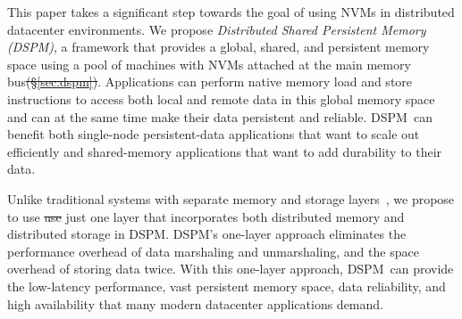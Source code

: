 \documentclass[sigconf]{acmart}
\renewcommand{\em}{\it}
\newcommand{\dsnvm}{DSPM}
\newcommand{\nvm}{PM}
\providecommand{\DIFdel}[1]{{\protect\color{red}\sout{#1}}}                      %
\providecommand{\DIFdelbegin}{} %
\providecommand{\DIFdelend}{} %
\begin{document}
This paper takes a significant step towards the goal of using NVMs in distributed datacenter environments.
We propose {\em Distributed Shared Persistent Memory (\dsnvm)},
a framework that provides a global, shared, and persistent memory space 
using a pool of machines with NVMs attached at the main memory bus\DIFdelbegin \DIFdel{(\S\ref{sec:dspm})}\DIFdelend .
Applications can perform native memory load and store instructions to access both local and remote data in this global memory space 
and can at the same time make their data persistent and reliable.
\dsnvm\ can benefit both single-node persistent-data applications that want to scale out efficiently
and shared-memory applications that want to add durability to their data.

Unlike traditional systems with separate memory and storage layers~\cite{Larchant,Perdis00,Larchant94,PerDis},
we propose to use \DIFdelbegin \DIFdel{use }\DIFdelend just one layer that incorporates both distributed memory and 
distributed storage in \dsnvm.
\dsnvm's one-layer approach eliminates the performance overhead of data marshaling and unmarshaling,
and the space overhead of storing data twice. 
With this one-layer approach, \dsnvm\ can provide the low-latency performance, 
vast persistent memory space, data reliability, and high availability
that many modern datacenter applications demand. 
\end{document}
